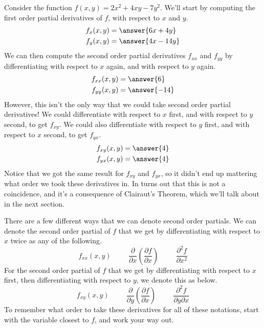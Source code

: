 \documentclass{ximera}
\begin{document}
\begin{example}
Consider the function $f(x,y) = 2x^2+4xy-7y^2$. We'll start by computing the first order partial derivatives of $f$, with respect to $x$ and $y$.
\begin{align*}
f_x(x,y) &= \answer{6x+4y}\\
f_y(x,y) &= \answer{4x-14y}
\end{align*}
We can then compute the second order partial derivatives $f_{xx}$ and $f_{yy}$ by differentiating with respect to $x$ again, and with respect to $y$ again.
\begin{align*}
f_{xx}(x,y) &= \answer{6}\\
f_{yy}(x,y) &= \answer{-14}
\end{align*}
However, this isn't the only way that we could take second order partial derivatives! We could differentiate with respect to $x$ first, and with respect to $y$ second, to get $f_{xy}$. We could also differentiate with respect to $y$ first, and with respect to $x$ second, to get $f_{yx}$.
\begin{align*}
f_{xy}(x,y) &= \answer{4}\\
f_{yx}(x,y) &= \answer{4}
\end{align*}
Notice that we got the same result for $f_{xy}$ and $f_{yx}$, so it didn't end up mattering what order we took these derivatives in. In turns out that this is not a coincidence, and it's a consequence of Clairaut's Theorem, which we'll talk about in the next section.
\end{example}

There are a few different ways that we can denote second order partials. We can denote the second order partial of $f$ that we get by differentiating with respect to $x$ twice as any of the following.
\[
f_{xx}(x,y)\hspace{1cm}\frac{\partial}{\partial x}\left(\frac{\partial f}{\partial x}\right)\hspace{1cm} \frac{\partial^2 f}{\partial x^2}
\]
For the second order partial of $f$ that we get by differentiating with respect to $x$ first, then differentiating with respect to $y$, we denote this as below.
\[
f_{xy}(x,y)\hspace{1cm}\frac{\partial}{\partial y}\left(\frac{\partial f}{\partial x}\right)\hspace{1cm} \frac{\partial^2 f}{\partial y\partial x}
\]
To remember what order to take these derivatives for all of these notations, start with the variable closest to $f$, and work your way out.
\end{document}
